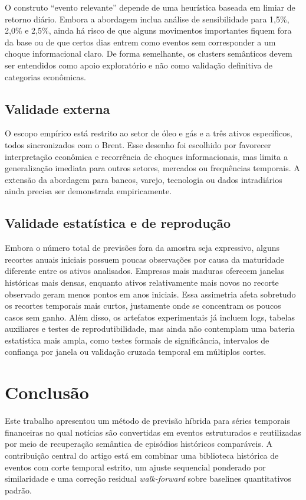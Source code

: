 \documentclass[conference]{IEEEtran}
\begin{document}
O construto ``evento relevante'' depende de uma heurística baseada em limiar de retorno diário. Embora a abordagem inclua análise de sensibilidade para 1,5\%, 2,0\% e 2,5\%, ainda há risco de que alguns movimentos importantes fiquem fora da base ou de que certos dias entrem como eventos sem corresponder a um choque informacional claro. De forma semelhante, os clusters semânticos devem ser entendidos como apoio exploratório e não como validação definitiva de categorias econômicas.

\subsection{Validade externa}

O escopo empírico está restrito ao setor de óleo e gás e a três ativos específicos, todos sincronizados com o Brent. Esse desenho foi escolhido por favorecer interpretação econômica e recorrência de choques informacionais, mas limita a generalização imediata para outros setores, mercados ou frequências temporais. A extensão da abordagem para bancos, varejo, tecnologia ou dados intradiários ainda precisa ser demonstrada empiricamente.

\subsection{Validade estatística e de reprodução}

Embora o número total de previsões fora da amostra seja expressivo, alguns recortes anuais iniciais possuem poucas observações por causa da maturidade diferente entre os ativos analisados. Empresas mais maduras oferecem janelas históricas mais densas, enquanto ativos relativamente mais novos no recorte observado geram menos pontos em anos iniciais. Essa assimetria afeta sobretudo os recortes temporais mais curtos, justamente onde se concentram os poucos casos sem ganho. Além disso, os artefatos experimentais já incluem logs, tabelas auxiliares e testes de reprodutibilidade, mas ainda não contemplam uma bateria estatística mais ampla, como testes formais de significância, intervalos de confiança por janela ou validação cruzada temporal em múltiplos cortes.

\section{Conclusão}

Este trabalho apresentou um método de previsão híbrida para séries temporais financeiras no qual notícias são convertidas em eventos estruturados e reutilizadas por meio de recuperação semântica de episódios históricos comparáveis. A contribuição central do artigo está em combinar uma biblioteca histórica de eventos com corte temporal estrito, um ajuste sequencial ponderado por similaridade e uma correção residual \textit{walk-forward} sobre baselines quantitativos padrão.
\end{document}
